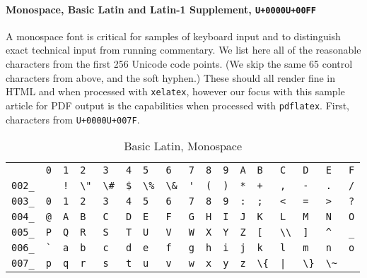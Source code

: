 \documentclass[10pt,]{article}
\theoremstyle{plain}
\theoremstyle{definition}
\theoremstyle{definition}
\theoremstyle{definition}
\theoremstyle{definition}
\theoremstyle{definition}
\theoremstyle{definition}
\numberwithin{equation}{section}
\begin{document}
\paragraph[{Monospace, Basic Latin and Latin-1 Supplement, \texttt{U+0000}\textendash{}\texttt{U+00FF}}]{Monospace, Basic Latin and Latin-1 Supplement, \texttt{U+0000}\textendash{}\texttt{U+00FF}}\hypertarget{paragraphs-9}{}
\hypertarget{p-604}{}%
A monospace font is critical for samples of keyboard input and to distinguish exact technical input from running commentary.  We list here all of the reasonable characters from the first 256 Unicode code points.  (We skip the same 65 control characters from above, and the soft hyphen.)  These should all render fine in HTML and when processed with \lstinline?xelatex?, however our focus with this sample article for PDF output is the capabilities when processed with \lstinline?pdflatex?.  First, characters from \lstinline?U+0000?\textendash{}\lstinline?U+007F?.%
\begin{table}
\centering
\begin{tabular}{lllllllllllllllll}
&\lstinline?0?&\lstinline?1?&\lstinline?2?&\lstinline?3?&\lstinline?4?&\lstinline?5?&\lstinline?6?&\lstinline?7?&\lstinline?8?&\lstinline?9?&\lstinline?A?&\lstinline?B?&\lstinline?C?&\lstinline?D?&\lstinline?E?&\lstinline?F?\tabularnewline[0pt]
\lstinline?002_?&\lstinline? ?&\lstinline?!?&&&\lstinline?$?&&&\lstinline?'?&\lstinline?(?&\lstinline?)?&\lstinline?*?&\lstinline?+?&\lstinline?,?&\lstinline?-?&\lstinline?.?&\lstinline?/?\tabularnewline[0pt]
\lstinline?003_?&\lstinline?0?&\lstinline?1?&\lstinline?2?&\lstinline?3?&\lstinline?4?&\lstinline?5?&\lstinline?6?&\lstinline?7?&\lstinline?8?&\lstinline?9?&\lstinline?:?&\lstinline?;?&\lstinline?<?&\lstinline?=?&\lstinline?>?&\lstinline|?|\tabularnewline[0pt]
\lstinline?004_?&\lstinline?@?&\lstinline?A?&\lstinline?B?&\lstinline?C?&\lstinline?D?&\lstinline?E?&\lstinline?F?&\lstinline?G?&\lstinline?H?&\lstinline?I?&\lstinline?J?&\lstinline?K?&\lstinline?L?&\lstinline?M?&\lstinline?N?&\lstinline?O?\tabularnewline[0pt]
\lstinline?005_?&\lstinline?P?&\lstinline?Q?&\lstinline?R?&\lstinline?S?&\lstinline?T?&\lstinline?U?&\lstinline?V?&\lstinline?W?&\lstinline?X?&\lstinline?Y?&\lstinline?Z?&\lstinline?[?&&\lstinline?]?&\lstinline?^?&\lstinline?_?\tabularnewline[0pt]
\lstinline?006_?&\lstinline?`?&\lstinline?a?&\lstinline?b?&\lstinline?c?&\lstinline?d?&\lstinline?e?&\lstinline?f?&\lstinline?g?&\lstinline?h?&\lstinline?i?&\lstinline?j?&\lstinline?k?&\lstinline?l?&\lstinline?m?&\lstinline?n?&\lstinline?o?\tabularnewline[0pt]
\lstinline?007_?&\lstinline?p?&\lstinline?q?&\lstinline?r?&\lstinline?s?&\lstinline?t?&\lstinline?u?&\lstinline?v?&\lstinline?w?&\lstinline?x?&\lstinline?y?&\lstinline?z?&&\lstinline?|?&&&
\end{tabular}
\caption{Basic Latin, Monospace\label{table-19}}
\end{table}
\end{document}
